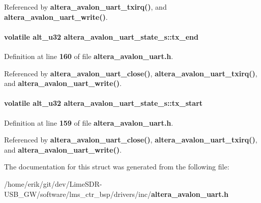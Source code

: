 Referenced by {\bf altera\+\_\+avalon\+\_\+uart\+\_\+txirq()}, and {\bf altera\+\_\+avalon\+\_\+uart\+\_\+write()}.

\paragraph[{tx\+\_\+end}]{\setlength{\rightskip}{0pt plus 5cm}volatile {\bf alt\+\_\+u32} altera\+\_\+avalon\+\_\+uart\+\_\+state\+\_\+s\+::tx\+\_\+end}\label{structaltera__avalon__uart__state__s_aedccaa68a3cd0197f9ab413c3742b810}


Definition at line {\bf 160} of file {\bf altera\+\_\+avalon\+\_\+uart.\+h}.



Referenced by {\bf altera\+\_\+avalon\+\_\+uart\+\_\+close()}, {\bf altera\+\_\+avalon\+\_\+uart\+\_\+txirq()}, and {\bf altera\+\_\+avalon\+\_\+uart\+\_\+write()}.

\paragraph[{tx\+\_\+start}]{\setlength{\rightskip}{0pt plus 5cm}volatile {\bf alt\+\_\+u32} altera\+\_\+avalon\+\_\+uart\+\_\+state\+\_\+s\+::tx\+\_\+start}\label{structaltera__avalon__uart__state__s_ac0bc32a5ebc66f4c7cfdd18399fa5be8}


Definition at line {\bf 159} of file {\bf altera\+\_\+avalon\+\_\+uart.\+h}.



Referenced by {\bf altera\+\_\+avalon\+\_\+uart\+\_\+close()}, {\bf altera\+\_\+avalon\+\_\+uart\+\_\+txirq()}, and {\bf altera\+\_\+avalon\+\_\+uart\+\_\+write()}.



The documentation for this struct was generated from the following file\+:\begin{DoxyCompactItemize}
\item 
/home/erik/git/dev/\+Lime\+S\+D\+R-\/\+U\+S\+B\+\_\+\+G\+W/software/lms\+\_\+ctr\+\_\+bsp/drivers/inc/{\bf altera\+\_\+avalon\+\_\+uart.\+h}\end{DoxyCompactItemize}
